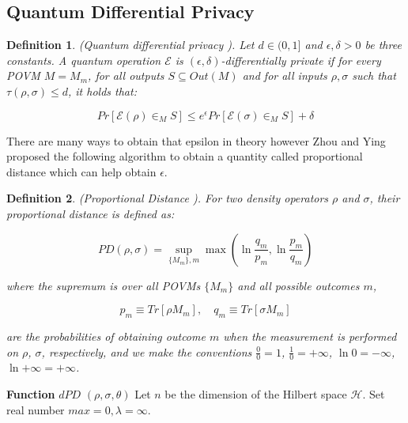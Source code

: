 \documentclass[11pt]{article}
\newtheorem{definition}{Definition}[section]
\begin{document}
\subsection{Quantum Differential Privacy}


\begin{definition}
    (Quantum differential privacy \cite{zhou2017differential}). Let $d \in (0,1]$ and $\epsilon,\delta > 0$ be three constants. A quantum operation $\mathcal{E}$ is $(\epsilon, \delta)$-differentially private if for every POVM $M = {M_m}$, for all outputs $S \subseteq Out(M)$ and for all inputs $\rho, \sigma$ such that $\tau(\rho, \sigma)\leq d$, it holds that:

    $$Pr[\mathcal{E}(\rho)\in_{M}S] \leq e^{\epsilon} Pr[\mathcal{E}(\sigma)\in_{M}S] + \delta$$
\end{definition}

There are many ways to obtain that epsilon in theory however Zhou and Ying proposed the following algorithm to obtain a quantity called proportional distance which can help obtain $\epsilon$.

\begin{definition}
    (Proportional Distance \cite{zhou2017differential}). For two density operators $\rho$ and $\sigma$, their proportional distance is defined as:

    $$PD(\rho, \sigma) = \sup_{\{M_m\}, m} \max\left(\ln\frac{q_m}{p_m}, \ln\frac{p_m}{q_m}\right)$$

    where the supremum is over all POVMs $\{M_m\}$ and all possible outcomes $m$,

    $$p_m \equiv Tr[\rho M_m], \quad q_m \equiv Tr[\sigma M_m]$$

    are the probabilities of obtaining outcome $m$ when the measurement is performed on $\rho$, $\sigma$, respectively, and we make the conventions $\frac{0}{0} = 1$, $\frac{1}{0} = +\infty$, $\ln 0 = -\infty$, $\ln{+\infty} = +\infty$.
\end{definition}

\begin{algorithm}[H]
    \DontPrintSemicolon
    \textbf{Function} $dPD$ $(\rho, \sigma, \theta)$\;
    Let $n$ be the dimension of the Hilbert space $\mathcal{H}$.\;
    Set real number $max = 0, \lambda = \infty$.\;
    \;
    \caption{Computing $dPD$ \cite{zhou2017differential}}
    \label{alg:dpd}
\end{algorithm}
\end{document}
